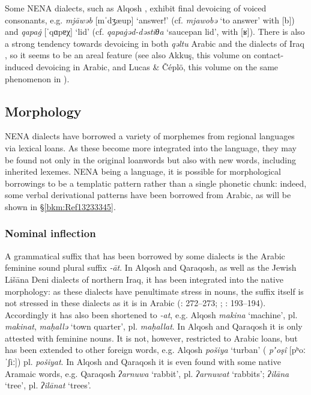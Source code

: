 \documentclass[output=paper]{langsci/langscibook}
\begin{document}
Some NENA dialects, such as  Alqosh \citep[27]{Coghill2004}, exhibit final {devoicing} of voiced consonants, e.g. \textit{mjāwəb} [mˈdʒæup] ‘answer!’ (cf. \textit{mjawobə} ‘to answer’ with [b]) and \textit{qapa\.g} [ˈqɑpɐχ] ‘lid’ (cf. \textit{qapa\.gəd-dəstiθa} ‘saucepan lid’, with [ʁ]). There is also a strong tendency towards {devoicing} in both \textit{qəltu} Arabic \citep[98]{Jastrow1978} and the  dialects of Iraq \citep[49]{MacKenzie1961}, so it seems to be an areal feature (see also Akkuş, this volume on contact-induced {devoicing} in  Arabic, and Lucas \& Čéplö, this volume on the same phenomenon in ).

\subsection{Morphology}

NENA dialects have borrowed a variety of morphemes from regional languages via lexical loans. As these become more integrated into the language, they may be found not only in the original {loanwords} but also with new words, including inherited lexemes. NENA being a  language, it is possible for morphological borrowings to be a templatic pattern rather than a single phonetic chunk: indeed, some verbal {derivational} patterns have been borrowed from Arabic, as will be shown in §\ref{bkm:Ref13233345}.

\subsubsection{\label{bkm:Ref534226861}Nominal inflection}

A grammatical suffix that has been borrowed by some  dialects is the Arabic feminine sound plural suffix \textit{{}-āt}. In  Alqosh and  Qaraqosh, as well as the Jewish Lišāna Deni dialects of northern Iraq, it has been integrated into the native morphology: as these dialects have penultimate {stress} in nouns, the suffix itself is not stressed in these dialects as it is in Arabic (\citealt{Coghill2004}: 272–273; \citeyear{Coghill2005}; \citealt{Khan2002}: 193–194). Accordingly it has also been shortened to \textit{\nobreakdash-at}, e.g.  Alqosh \textit{makina} ‘machine’, pl. \textit{makinat}, \textit{maḥallə} ‘town quarter’, pl. \textit{maḥallat}. In Alqosh and Qaraqosh it is only attested with feminine nouns. It is not, however, restricted to Arabic loans, but has been extended to other foreign words, e.g. Alqosh \textit{pošiya} ‘turban’ ( \textit{pʼoşî} [pʰoːˈʃiː]) pl. \textit{pošiyat}. In Alqosh and Qaraqosh it is even found with some native Aramaic words, e.g.  Qaraqosh \textit{ʔarnuwa} ‘rabbit’, pl. \textit{ʔarnuwat} ‘rabbits’; \textit{ʔilāna} ‘tree’, pl. \textit{ʔilānat} ‘trees’.
\end{document}
